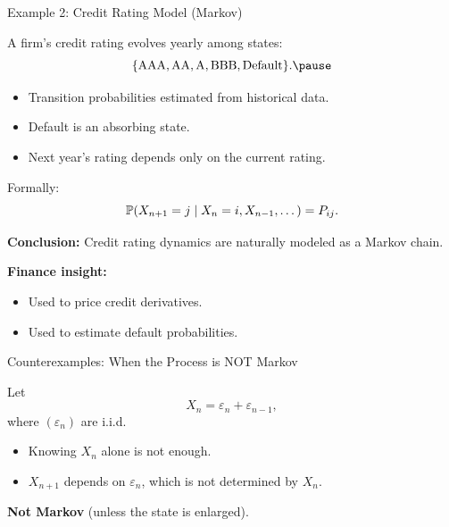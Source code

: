 \documentclass[aspectratio=169]{beamer}
\begin{document}
\begin{frame}{Example 2: Credit Rating Model (Markov)}

A firm’s credit rating evolves yearly among states:
\[
\{\text{AAA},\text{AA},\text{A},\text{BBB},\text{Default}\}.\pause
\vspace{-5mm}
\]
\begin{itemize}
  \item \pause Transition probabilities estimated from historical data.\pause
  \item Default is an absorbing state.\pause
  \item Next year’s rating depends only on the current rating.\pause
\end{itemize}

\medskip
Formally:
\[
\mathbb{P}(X_{n+1}=j \mid X_n=i, X_{n-1},\dots)=P_{ij}.
\vspace{-3mm}
\]

\textbf{Conclusion:} Credit rating dynamics are naturally modeled as a Markov chain.\pause

\medskip
\textbf{Finance insight:}
\vspace{-3mm}
\begin{itemize}
  \item Used to price credit derivatives.\pause
  \item Used to estimate default probabilities.
\end{itemize}
\end{frame}

\begin{frame}{Counterexamples: When the Process is NOT Markov}

Let
\[
X_n = \varepsilon_n + \varepsilon_{n-1},
\]\pause
where $(\varepsilon_n)$ are i.i.d.

\begin{itemize}
  \item Knowing $X_n$ alone is not enough.\pause
  \item $X_{n+1}$ depends on $\varepsilon_n$, which is not determined by $X_n$.\pause
\end{itemize}

\medskip
\textbf{Not Markov} (unless the state is enlarged).

\end{frame}
\end{document}
